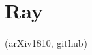 \section{Ray}
\label{sec:ray}

\cite{schaarschmidt2018rlgraph}(\href{https://arxiv.org/abs/1810.09028}{arXiv1810}, \href{https://github.com/rlgraph/rlgraph}{github})